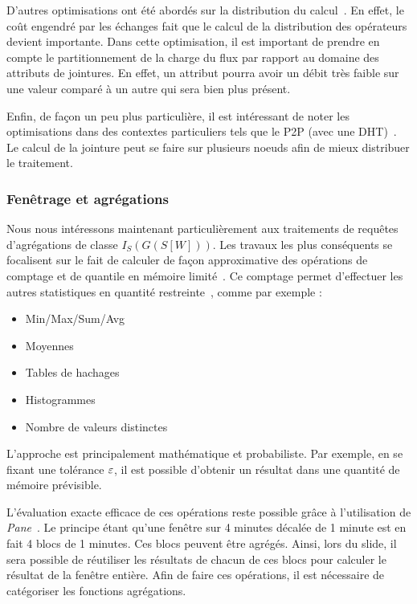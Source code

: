 D'autres optimisations ont été abordés sur la distribution du calcul~\cite{Zhou:pmjoin}. En effet, le coût engendré par les échanges fait que le calcul de la distribution des opérateurs devient importante. Dans cette optimisation, il est important de prendre en compte le partitionnement de la charge du flux par rapport au domaine des attributs de jointures. En effet, un attribut pourra avoir un débit très faible sur une valeur comparé à un autre qui sera bien plus présent.

Enfin, de façon un peu plus particulière, il est intéressant de noter les optimisations dans des contextes particuliers tels que le P2P (avec une DHT)~\cite{Palma:p2p}. Le calcul de la jointure peut se faire sur plusieurs noeuds afin de mieux distribuer le traitement.

\subsubsection{Fenêtrage et agrégations}
Nous nous intéressons maintenant particulièrement aux traitements de requêtes d'agrégations de classe $I_S(G(S[W]))$. Les travaux les plus conséquents se focalisent sur le fait de calculer de façon approximative des opérations de comptage et de quantile en mémoire limité~\cite{Arasu:window}. Ce comptage permet d'effectuer les autres statistiques en quantité restreinte~\cite{Datar:stats}, comme par exemple : 
\begin{itemize}
 \item Min/Max/Sum/Avg 
 \item Moyennes
 \item Tables de hachages
 \item Histogrammes
 \item Nombre de valeurs distinctes
\end{itemize}

L'approche est principalement mathématique et probabiliste. Par exemple, en se fixant une tolérance $\varepsilon$, il est possible d'obtenir un résultat dans une quantité de mémoire prévisible.

L'évaluation exacte efficace de ces opérations reste possible grâce à l'utilisation de \textit{Pane}~\cite{Li:pane}. Le principe étant qu'une fenêtre sur 4 minutes décalée de 1 minute est en fait 4 blocs de 1 minutes. Ces blocs peuvent être agrégés. Ainsi, lors du slide, il sera possible de réutiliser les résultats de chacun de ces blocs pour calculer le résultat de la fenêtre entière. Afin de faire ces opérations, il est nécessaire de catégoriser les fonctions agrégations. 

